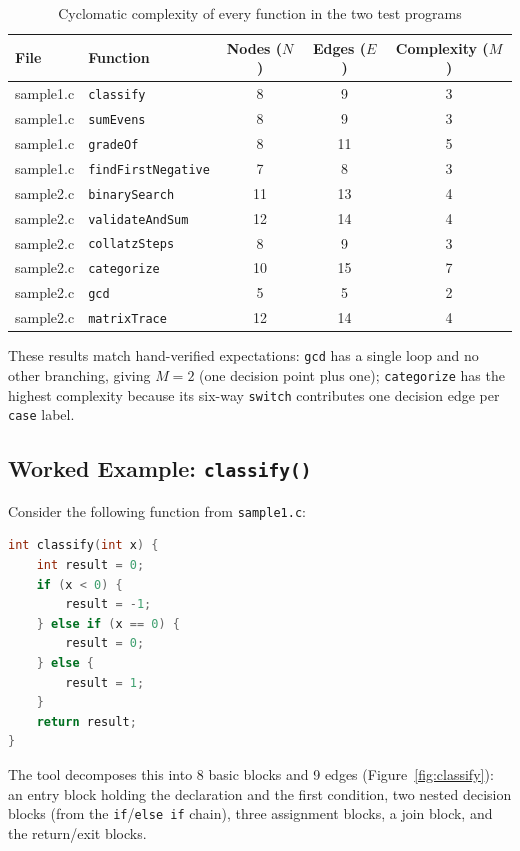 \documentclass[11pt]{article}
\begin{document}
\begin{table}[h]
\centering
\begin{tabular}{@{}llccc@{}}
\toprule
\textbf{File} & \textbf{Function} & \textbf{Nodes ($N$)} & \textbf{Edges ($E$)} & \textbf{Complexity ($M$)} \\
\midrule
sample1.c & \texttt{classify}           & 8  & 9  & 3 \\
sample1.c & \texttt{sumEvens}           & 8  & 9  & 3 \\
sample1.c & \texttt{gradeOf}            & 8  & 11 & 5 \\
sample1.c & \texttt{findFirstNegative}  & 7  & 8  & 3 \\
\midrule
sample2.c & \texttt{binarySearch}       & 11 & 13 & 4 \\
sample2.c & \texttt{validateAndSum}     & 12 & 14 & 4 \\
sample2.c & \texttt{collatzSteps}       & 8  & 9  & 3 \\
sample2.c & \texttt{categorize}         & 10 & 15 & 7 \\
sample2.c & \texttt{gcd}                & 5  & 5  & 2 \\
sample2.c & \texttt{matrixTrace}        & 12 & 14 & 4 \\
\bottomrule
\end{tabular}
\caption{Cyclomatic complexity of every function in the two test programs}
\label{tab:results}
\end{table}

These results match hand-verified expectations: \texttt{gcd} has a single loop and no other branching, giving $M=2$ (one decision point plus one); \texttt{categorize} has the highest complexity because its six-way \texttt{switch} contributes one decision edge per \texttt{case} label.

\subsection{Worked Example: \texttt{classify()}}
Consider the following function from \texttt{sample1.c}:
\begin{lstlisting}[language=C]
int classify(int x) {
    int result = 0;
    if (x < 0) {
        result = -1;
    } else if (x == 0) {
        result = 0;
    } else {
        result = 1;
    }
    return result;
}
\end{lstlisting}
The tool decomposes this into 8 basic blocks and 9 edges (Figure~\ref{fig:classify}): an entry block holding the declaration and the first condition, two nested decision blocks (from the \texttt{if}/\texttt{else if} chain), three assignment blocks, a join block, and the return/exit blocks.
\end{document}
